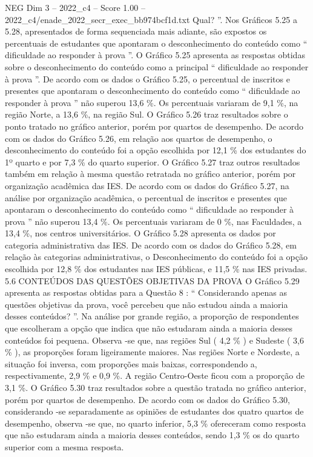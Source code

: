\begin{textsample}{NEG Dim 3 – 2022\_c4 – Score 1.00 – 2022\_c4/enade\_2022\_secr\_exec\_bb974bcf1d.txt}
Qual? ”.
Nos Gráficos 5.25 a 5.28, apresentados de forma sequenciada mais adiante, são expostos os percentuais de estudantes que apontaram o desconhecimento do conteúdo como “ dificuldade ao responder à prova ”.
O Gráfico 5.25 apresenta as respostas obtidas sobre o desconhecimento do conteúdo como a principal “ dificuldade ao responder à prova ”.
De acordo com os dados o Gráfico 5.25, o percentual de inscritos e presentes que apontaram o desconhecimento do conteúdo como “ dificuldade ao responder à prova ” não superou 13,6 \%.
Os percentuais variaram de 9,1 \%, na região Norte, a 13,6 \%, na região Sul.
O Gráfico 5.26 traz resultados sobre o ponto tratado no gráfico anterior, porém por quartos de desempenho.
De acordo com os dados do Gráfico 5.26, em relação aos quartos de desempenho, o desconhecimento do conteúdo foi a opção escolhida por 12,1 \% dos estudantes do 1º quarto e por 7,3 \% do quarto superior.
O Gráfico 5.27 traz outros resultados também em relação à mesma questão retratada no gráfico anterior, porém por organização acadêmica das IES.
De acordo com os dados do Gráfico 5.27, na análise por organização acadêmica, o percentual de inscritos e presentes que apontaram o desconhecimento do conteúdo como “ dificuldade ao responder à prova ” não superou 13,4 \%.
Os percentuais variaram de 0 \%, nas Faculdades, a 13,4 \%, nos centros universitários.
O Gráfico 5.28 apresenta os dados por categoria administrativa das IES.
De acordo com os dados do Gráfico 5.28, em relação às categorias administrativas, o Desconhecimento do conteúdo foi a opção escolhida por 12,8 \% dos estudantes nas IES públicas, e 11,5 \% nas IES privadas. 5.6 CONTEÚDOS DAS QUESTÕES OBJETIVAS DA PROVA O Gráfico 5.29 apresenta as respostas obtidas para a Questão 8 : “ Considerando apenas as questões objetivas da prova, você percebeu que não estudou ainda a maioria desses conteúdos? ”.
Na análise por grande região, a proporção de respondentes que escolheram a opção que indica que não estudaram ainda a maioria desses conteúdos foi pequena.
Observa -se que, nas regiões Sul ( 4,2 \% ) e Sudeste ( 3,6 \% ), as proporções foram ligeiramente maiores.
Nas regiões Norte e Nordeste, a situação foi inversa, com proporções mais baixas, correspondendo a, respectivamente, 2,9 \% e 0,9 \%.
A região Centro-Oeste ficou com a proporção de 3,1 \%.
O Gráfico 5.30 traz resultados sobre a questão tratada no gráfico anterior, porém por quartos de desempenho.
De acordo com os dados do Gráfico 5.30, considerando -se separadamente as opiniões de estudantes dos quatro quartos de desempenho, observa -se que, no quarto inferior, 5,3 \% ofereceram como resposta que não estudaram ainda a maioria desses conteúdos, sendo 1,3 \% os do quarto superior com a mesma resposta.

\end{textsample}
